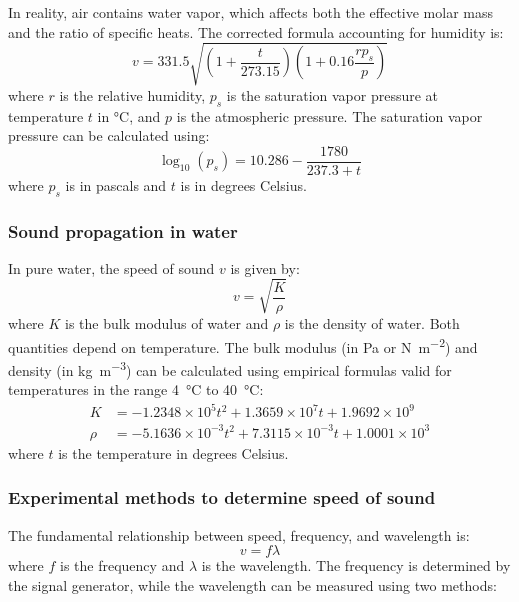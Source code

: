 \documentclass[12pt]{article}
\begin{document}
In reality, air contains water vapor, which affects both the effective molar mass and the ratio of specific heats. The corrected formula accounting for humidity is:
\begin{equation}
v = 331.5\sqrt{\left(1 + \frac{t}{273.15}\right)\left(1 + 0.16\frac{rp_s}{p}\right)}
\end{equation}
where $r$ is the relative humidity, $p_s$ is the saturation vapor pressure at temperature $t$ in \si{\celsius}, and $p$ is the atmospheric pressure. The saturation vapor pressure can be calculated using:
\begin{equation}
\log_{10}(p_s) = 10.286 - \frac{1780}{237.3 + t}
\end{equation}
where $p_s$ is in pascals and $t$ is in degrees Celsius.

\subsubsection{Sound propagation in water}

In pure water, the speed of sound $v$ is given by:
\begin{equation}
v = \sqrt{\frac{K}{\rho}}
\end{equation}
where $K$ is the bulk modulus of water and $\rho$ is the density of water. Both quantities depend on temperature. The bulk modulus (in \si{\pascal} or \si{\newton\per\meter\squared}) and density (in \si{\kilogram\per\meter\cubed}) can be calculated using empirical formulas valid for temperatures in the range \SI{4}{\celsius} to \SI{40}{\celsius}:
\begin{align}
K &= -1.2348 \times 10^5 t^2 + 1.3659 \times 10^7 t + 1.9692 \times 10^9 \\
\rho &= -5.1636 \times 10^{-3} t^2 + 7.3115 \times 10^{-3} t + 1.0001 \times 10^3
\end{align}
where $t$ is the temperature in degrees Celsius.

\subsubsection{Experimental methods to determine speed of sound}

The fundamental relationship between speed, frequency, and wavelength is:
\begin{equation}
v = f\lambda
\end{equation}
where $f$ is the frequency and $\lambda$ is the wavelength. The frequency is determined by the signal generator, while the wavelength can be measured using two methods:
\end{document}
